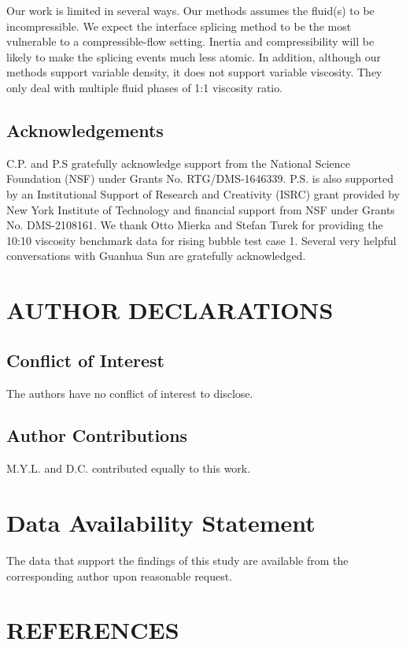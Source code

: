 \documentclass[%
 aip,
 amsmath,amssymb,
 reprint,
 floatfix
]{revtex4-1}
\begin{document}
Our work is limited in several ways. Our methods assumes the fluid(s) to be incompressible. We expect the interface splicing method to be the most vulnerable to a compressible-flow setting. Inertia and compressibility will be likely to make the splicing events much less atomic. In addition, although our methods support variable density, it does not support variable viscosity. They only deal with multiple fluid phases of 1:1 viscosity ratio.


\subsection*{Acknowledgements}
C.P. and P.S gratefully acknowledge support from the National Science Foundation (NSF) under Grants No. RTG/DMS-1646339. P.S. is also supported by an Institutional Support of Research and Creativity (ISRC) grant provided by New York Institute of Technology and financial support from NSF under Grants No. DMS-2108161. We thank Otto Mierka and Stefan Turek for providing the 10:10 viscosity benchmark data for rising bubble test case 1. Several very helpful conversations with Guanhua Sun are gratefully acknowledged. 

\section*{AUTHOR DECLARATIONS}

\subsection*{Conflict of Interest}
The authors have no conflict of interest to disclose.


\subsection*{Author Contributions}
M.Y.L. and D.C. contributed equally to this work.


\section*{Data Availability Statement}
The data that support the findings of this study are available
from the corresponding author upon reasonable request.

\section*{REFERENCES}

\end{document}
